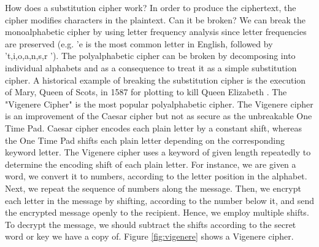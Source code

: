 How does a substitution cipher work? In order to produce the ciphertext, the cipher modifies characters in the plaintext. Can it be broken? We can break the monoalphabetic cipher by using letter frequency analysis since letter frequencies are preserved (e.g. 'e is the most common letter in English, followed by 't,i,o,a,n,s,r '). The polyalphabetic cipher can be broken by decomposing into individual alphabets and as a consequence to treat it as a simple substitution cipher. A historical example of breaking the substitution cipher is the execution of Mary, Queen of Scots, in 1587 for plotting to kill Queen Elizabeth \cite{maryscots}. The "Vigenere Cipher" is the most popular polyalphabetic cipher. The Vigenere cipher is an improvement of the Caesar cipher but not as secure as the unbreakable One Time Pad. Caesar cipher encodes each plain letter by a constant shift, whereas the One Time Pad shifts each plain letter depending on the corresponding keyword letter. The Vigenere cipher uses a keyword of given length repeatedly to determine the encoding shift of each plain letter. For instance, we are given a word, we convert it to numbers, according to the letter position in the alphabet. Next, we repeat the sequence of numbers along the message. Then, we encrypt each letter in the message by shifting, according to the number below it, and send the encrypted message openly to the recipient. Hence, we employ multiple shifts. To decrypt the message, we should subtract the shifts according to the secret word or key we have a copy of. Figure \ref{fig:vigenere} shows a Vigenere cipher.

